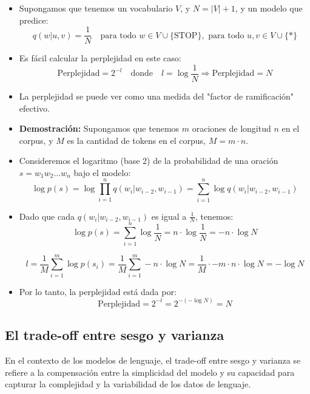 \begin{itemize}
    \item Supongamos que tenemos un vocabulario $V$, y $N = |V| + 1$, y un modelo que predice:
    \[
        q(w|u, v) = \frac{1}{N} \quad \text{para todo } w \in V \cup \{\text{STOP}\}, \text{ para todo } u, v \in V \cup \{*\}
    \]
    \item Es fácil calcular la perplejidad en este caso:
    \[
        \text{Perplejidad} = 2^{-l} \quad \text{donde} \quad l = \log \frac{1}{N} \Rightarrow \text{Perplejidad} = N
    \]
    \item La perplejidad se puede ver como una medida del "factor de ramificación" efectivo.
    
    \item \textbf{Demostración:} Supongamos que tenemos $m$ oraciones de longitud $n$ en el corpus, y $M$ es la cantidad de tokens en el corpus, $M = m \cdot n$.
    
    \item Consideremos el logaritmo (base 2) de la probabilidad de una oración $s = w_1 w_2 \dots w_n$ bajo el modelo:
    \[
        \log p(s) = \log \prod_{i=1}^{n} q(w_i|w_{i-2}, w_{i-1}) = \sum_{i=1}^{n} \log q(w_i|w_{i-2}, w_{i-1})
    \]
    \item Dado que cada $q(w_i|w_{i-2}, w_{i-1})$ es igual a $\frac{1}{N}$, tenemos:
    \[
        \log p(s) = \sum_{i=1}^{n} \log \frac{1}{N} = n \cdot \log \frac{1}{N} = -n \cdot \log N
    \]
    
    
    \[
        l =  \frac{1}{M} \sum_{i=1}^{m} \log p(s_i) = \frac{1}{M} \sum_{i=1}^{m} -n \cdot \log N  = \frac{1}{M} \cdot -m \cdot n \cdot \log N = - \log N 
    \]
    
            
    \item Por lo tanto, la perplejidad está dada por:
    \[
        \text{Perplejidad} = 2^{-l} = 2^{-(- \log N)} = N
    \]
\end{itemize}

\subsection{El trade-off entre sesgo y varianza}

En el contexto de los modelos de lenguaje, el trade-off entre sesgo y varianza se refiere a la compensación entre la simplicidad del modelo y su capacidad para capturar la complejidad y la variabilidad de los datos de lenguaje.

